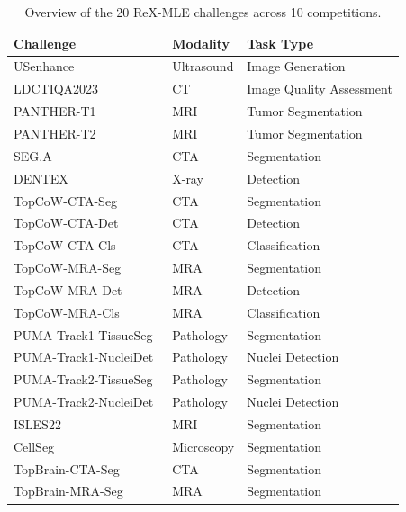 \documentclass{midl} %
\begin{document}
\begin{table}[!t]
\footnotesize
\centering  
\caption{Overview of the 20 ReX-MLE challenges across 10 competitions.}\vspace{3pt}
\label{tab:medical_mlebench_overview}
\setlength{\tabcolsep}{10pt}
\begin{tabular}{lll}
\toprule
\textbf{Challenge} & \textbf{Modality} & \textbf{Task Type} \\
\midrule
USenhance ~\cite{usenhance} & Ultrasound & Image Generation \\
LDCTIQA2023~\cite{ldct_iqa} & CT & Image Quality Assessment \\
PANTHER-T1 ~\cite{panther} & MRI & Tumor Segmentation \\
PANTHER-T2 ~\cite{panther} & MRI & Tumor Segmentation \\
SEG.A ~\cite{seg_a} & CTA & Segmentation \\
DENTEX~\cite{hamamci2023dentex} & X-ray & Detection \\
TopCoW-CTA-Seg~\cite{topcow} & CTA & Segmentation \\
TopCoW-CTA-Det~\cite{topcow} & CTA & Detection \\
TopCoW-CTA-Cls~\cite{topcow} & CTA & Classification \\
TopCoW-MRA-Seg~\cite{topcow} & MRA & Segmentation \\
TopCoW-MRA-Det~\cite{topcow} & MRA & Detection \\
TopCoW-MRA-Cls~\cite{topcow} & MRA & Classification \\
PUMA-Track1-TissueSeg~\cite{puma} & Pathology & Segmentation \\
PUMA-Track1-NucleiDet~\cite{puma} & Pathology & Nuclei Detection \\
PUMA-Track2-TissueSeg~\cite{puma} & Pathology & Segmentation \\
PUMA-Track2-NucleiDet~\cite{puma} & Pathology & Nuclei Detection \\
ISLES22~\cite{hernandez2022isles} & MRI & Segmentation \\
CellSeg \cite{neurips_cellseg} & Microscopy & Segmentation \\
TopBrain-CTA-Seg ~\cite{topcow} & CTA & Segmentation \\
TopBrain-MRA-Seg ~\cite{topcow} & MRA & Segmentation \\
\bottomrule
\end{tabular}
\end{table}
\end{document}
